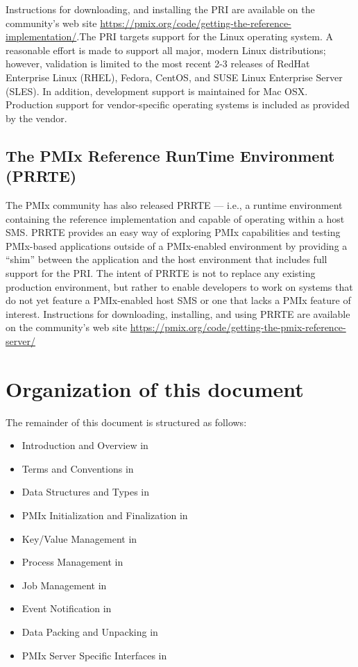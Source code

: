 Instructions for downloading, and installing the \ac{PRI} are available
on the community's web site \url{https://pmix.org/code/getting-the-reference-implementation/}.The \ac{PRI} targets support for the Linux operating system.
A reasonable effort is made to support all major, modern Linux distributions; however, validation is limited to the most recent 2-3 releases of RedHat Enterprise Linux (RHEL), Fedora, CentOS, and SUSE Linux Enterprise Server (SLES).
In addition, development support is maintained for Mac OSX.
Production support for vendor-specific operating systems is included as provided by the vendor.


\subsection{The PMIx Reference RunTime Environment (PRRTE)}

The \ac{PMIx} community has also released \ac{PRRTE} --- i.e., a runtime environment
containing the reference implementation and capable of operating within a host \ac{SMS}. \ac{PRRTE}
provides an easy way of exploring \ac{PMIx} capabilities and testing PMIx-based
applications outside of a PMIx-enabled environment by providing a ``shim'' between the application and the host environment that includes full support for the \ac{PRI}. The intent of \ac{PRRTE} is not to replace any existing production environment, but rather to enable developers to work on systems that do not yet feature a PMIx-enabled host \ac{SMS} or one that lacks a \ac{PMIx} feature of interest. Instructions for downloading,
installing, and using \ac{PRRTE} are available
on the community's web site \url{https://pmix.org/code/getting-the-pmix-reference-server/}

\section{Organization of this document}

The remainder of this document is structured as follows:

\begin{itemize}
\item Introduction and Overview in 
\item Terms and Conventions in 
\item Data Structures and Types in 
\item \ac{PMIx} Initialization and Finalization in 
\item Key/Value Management in 
\item Process Management in 
\item Job Management in 
\item Event Notification in 
\item Data Packing and Unpacking in 
\item \ac{PMIx} Server Specific Interfaces in 
\end{itemize}

